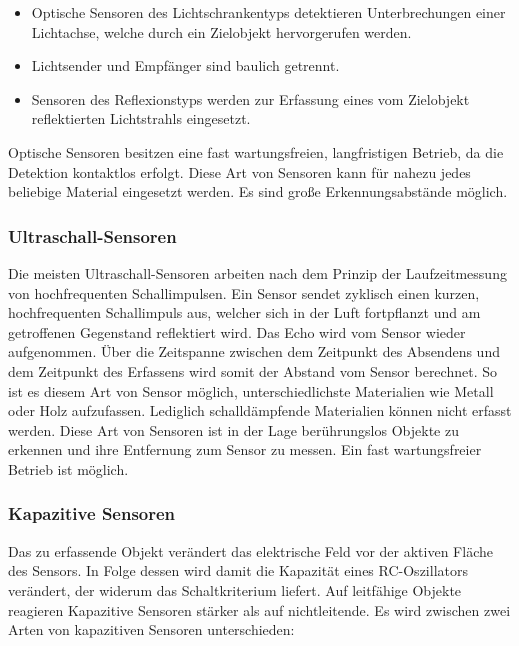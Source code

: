 \begin{itemize}
    \item Optische Sensoren des Lichtschrankentyps detektieren Unterbrechungen einer Lichtachse, welche durch ein Zielobjekt hervorgerufen werden.
    \item Lichtsender und Empfänger sind baulich getrennt.

    \item Sensoren des Reflexionstyps werden zur Erfassung eines vom Zielobjekt reflektierten Lichtstrahls eingesetzt.
\end{itemize}

Optische Sensoren besitzen eine fast wartungsfreien, langfristigen Betrieb, da die Detektion kontaktlos erfolgt.
Diese Art von Sensoren kann für nahezu jedes beliebige Material eingesetzt werden.
Es sind große Erkennungsabstände möglich.

\subsubsection{Ultraschall-Sensoren}
Die meisten Ultraschall-Sensoren arbeiten nach dem Prinzip der Laufzeitmessung von hochfrequenten Schallimpulsen.
Ein Sensor sendet zyklisch einen kurzen, hochfrequenten Schallimpuls aus, welcher sich in der Luft fortpflanzt und am getroffenen Gegenstand reflektiert wird.
Das Echo wird vom Sensor wieder aufgenommen.
Über die Zeitspanne zwischen dem Zeitpunkt des Absendens und dem Zeitpunkt des Erfassens wird somit der Abstand vom Sensor berechnet.
So ist es diesem Art von Sensor möglich, unterschiedlichste Materialien wie Metall oder Holz aufzufassen.
Lediglich schalldämpfende Materialien können nicht erfasst werden.
Diese Art von Sensoren ist in der Lage berührungslos Objekte zu erkennen und ihre Entfernung zum Sensor zu messen.
Ein fast wartungsfreier Betrieb ist möglich.

\subsubsection{Kapazitive Sensoren}
Das zu erfassende Objekt verändert das elektrische Feld vor der aktiven Fläche des Sensors.
In Folge dessen wird damit die Kapazität eines RC-Oszillators verändert, der widerum das Schaltkriterium liefert.
Auf leitfähige Objekte reagieren Kapazitive Sensoren stärker als auf nichtleitende.
Es wird zwischen zwei Arten von kapazitiven Sensoren unterschieden: \\

